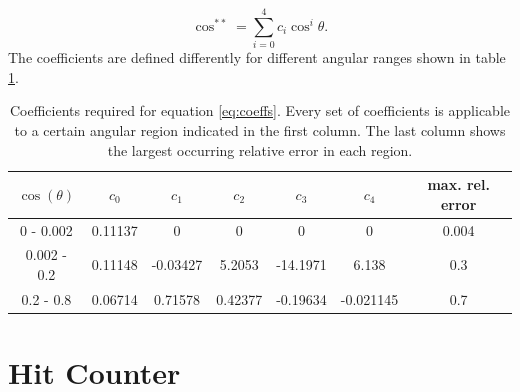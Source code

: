   \begin{equation}
  	\cos^{**} = \sum_{i=0}^{4}{c_i \cos^i{\theta}}.
  	\label{eq:coeffs}
  \end{equation}
  The coefficients are defined differently for different angular ranges shown in table \ref{tab:coefficients}.
  \begin{table}
  \centering
  	\caption[Angular Distribution Coefficients]{Coefficients required for equation \ref{eq:coeffs}. Every set of coefficients is applicable to a certain angular region indicated in the first column. The last column shows the largest occurring relative error in each region. }
	\label{tab:coefficients}
  	\begin{tabular}{|c|c|c|c|c|c|c|}
  	\hline
  		$\cos{\left(\theta\right)}$ & $c_0$ & $c_1$ & $c_2$ & $c_3$ & $c_4$ & max. rel. error\\
  		\hline
  		0 - 0.002 & 0.11137 & 0 & 0 & 0 & 0 & 0.004\\
	
  		0.002 - 0.2 & 0.11148 & -0.03427 & 5.2053 & -14.1971 & 6.138 & 0.3\\
  		0.2 - 0.8 & 0.06714 & 0.71578 & 0.42377 & -0.19634 & -0.021145 & 0.7\\
  		\hline
  	\end{tabular}

  \end{table}

  
  \section{Hit Counter}
  \label{ch:Simulation software:sec:Hit counter}
  
